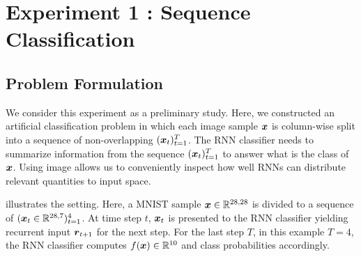 

 

\section{Experiment 1 : Sequence Classification}
\label{sec:exp1}

\subsection{Problem Formulation}
We consider this experiment as a preliminary study. Here, we constructed an artificial classification problem in which each image sample $\boldsymbol{x}$ is column-wise split into a sequence of non-overlapping $(\boldsymbol{x}_t)_{t=1}^{T}$. The RNN classifier needs to summarize information from the sequence $(\boldsymbol{x}_t)_{t=1}^{T}$ to answer what is the class of $\boldsymbol{x}$.   Using image allows us to conveniently inspect how well RNNs can distribute relevant quantities to input space. 

\addfigure{\ref{fig:artificial_problem}} illustrates the setting. Here, a MNIST sample $ \patvector{x} \in \mathbb{R}^{28,28}$ is divided to a sequence of $( \patvector{x}_t \in   \mathbb{R}^{28,7} )_{t=1} ^ 4$. At time step $t$, $\patvector{x}_t$ is presented to the RNN classifier yielding recurrent input $\patvector{r}_{t+1}$ for the next step. For the last step $T$, in this example $T = 4$, the RNN classifier computes $f(\boldsymbol{x}) \in \mathbb{R}^{10}$ and class probabilities accordingly.


